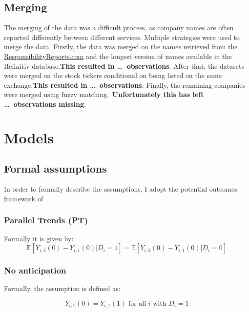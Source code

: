 \documentclass[12pt]{article}
\begin{document}
\subsection{Merging}\label{app:data:merging}

The merging of the data was a difficult process, as company names are often reported differently between different services. Multiple strategies were used to merge the data. Firstly, the data was merged on the names retrieved from the \href{https://responsibilityreports.com}{ResponsibilityReports.com} and the longest version of names available in the Refinitiv database.\@ \textbf{This resulted in \dots\ observations}. After that, the datasets were merged on the stock tickers conditional on being listed on the same exchange.\@ \textbf{This resulted in \dots\ observations}. Finally, the remaining companies were merged using fuzzy matching.\ \textbf{Unfortunately this has left \dots\ observations missing}.

\section{Models}\label{app:models}

\subsection{Formal assumptions}\label{app:models:assumptions}
In order to formally describe the assumptions, I adopt the potential outcomes framework of~\cite{rubinEstimatingCausalEffects1974}

\subsubsection{Parallel Trends (PT)}

Formally it is given by: 
\begin{equation}
    \mathbb{E}[Y_{i,2}(0) - Y_{i,1}(0) | D_i = 1] = \mathbb{E}[Y_{i,2}(0) - Y_{i,1}(0) | D_i = 0]
\end{equation}

\subsubsection{No anticipation}
Formally, the assumption is defined as:

\begin{equation}
    Y_{i,1}(0) = Y_{i,1}(1) \text{ for all } i \text{ with } D_i = 1
\end{equation}
\end{document}
